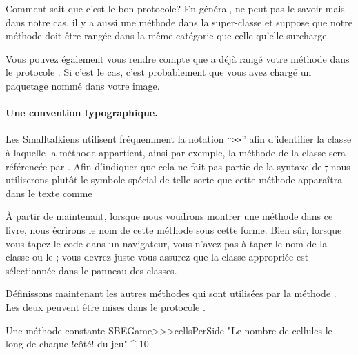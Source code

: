 \documentclass[a4paper,10pt,twoside]{book}
\begin{document}
Comment \pharo sait que c'est le bon protocole? En général,
\pharo ne peut pas le savoir mais dans notre cas, il y a aussi une méthode  dans la super-classe et \pharo suppose que notre méthode  doit \^etre rangée dans la m\^eme catégorie que celle qu'elle surcharge.

Vous pouvez également vous rendre compte que \pharo a déjà rangé votre
méthode  dans le protocole . Si
c'est le cas, c'est probablement que vous avez chargé un paquetage nommé  dans votre image.

\paragraph{Une convention typographique.} Les Smalltalkiens utilisent fréquemment la notation ``\verb|>>|'' afin d'identifier la classe à laquelle la méthode appartient, ainsi par exemple, la méthode  de la classe  sera référencée par .
Afin d'indiquer que cela ne fait pas partie de la syntaxe de \st, nous utiliserons plutôt le symbole spécial \ct{>>>} de telle sorte que cette méthode apparaîtra dans le texte comme 

À partir de maintenant, lorsque nous voudrons montrer une méthode dans ce livre, nous écrirons le nom de cette méthode sous cette forme. Bien s\^ur, lorsque vous tapez le code dans un navigateur, vous n'avez pas à taper le nom de la classe ou le \ct{>>>}; vous devrez juste vous assurez que la classe appropriée est sélectionnée dans le panneau des classes.

Définissons maintenant les autres méthodes qui sont utilisées par la méthode . Les deux peuvent \^etre mises dans le protocole .

\begin{method}[sbegamecellsperside]{Une méthode constante}
SBEGame>>>cellsPerSide
   "Le nombre de cellules le long de chaque !c\^oté! du jeu"
   ^ 10
\end{method}
\end{document}
